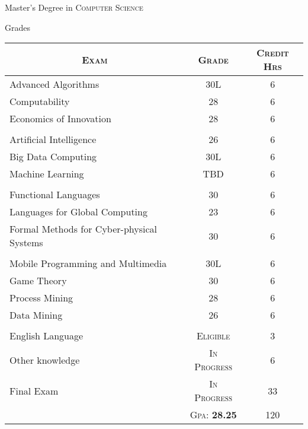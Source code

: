 \documentclass[a4paper,10pt]{article}
\begin{document}
%

\newpage
\par{\centering\Large \hypertarget{mrds}{Master's Degree in \textsc{Computer Science}} \par}\large{\centering Grades\par}\normalsize
\begin{center}
\begin{tabular}{lcc}
\multicolumn{1}{c}{\textsc{Exam}}&\textsc{Grade}&\textsc{Credit Hrs}\\ \hline
Advanced Algorithms	&30L&	6\\
Computability	&28& 6 \\
Economics of Innovation	&28	& 6\\ \\

Artificial Intelligence	&26& 6\\
Big Data Computing	&30L& 6\\
Machine Learning	&TBD&	6\\	\\

Functional Languages	&30& 6\\
Languages for Global Computing &23&6\\
Formal Methods for Cyber-physical Systems & 30 & 6\\ \\

Mobile Programming and Multimedia	&30L&	6\\
Game Theory	&30 &	6\\
Process Mining	&28 &	6\\
Data Mining	& 26 &	6\\ \\

English Language	& \textsc{Eligible} &	3\\
Other knowledge & \textsc{In Progress} & 6 \\
Final Exam	& \textsc{In Progress}	& 33 \\	
		\cline{2-3}
	&\textsc{Gpa: } \textbf{28.25} & 120 \\
\end{tabular}
\end{center}
\end{document}
